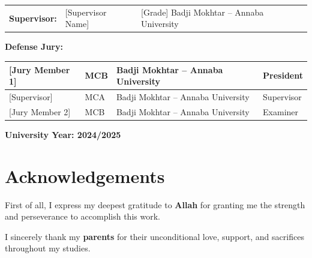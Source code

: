 \documentclass[12pt,a4paper]{report}
\begin{document}
\begin{titlepage}
  \begin{center}
    \begin{tabular}{lll}
      \textbf{Supervisor:} & [Supervisor Name] \quad & [Grade] \quad Badji Mokhtar -- Annaba University
    \end{tabular}
  \end{center}

  \vspace{0.45cm}

  \begin{center}
    \textbf{Defense Jury:}\\[8pt]
    \begin{tabular}{|p{3.8cm}|p{1.5cm}|p{4.2cm}|p{2.5cm}|}
      \hline
      {[Jury Member 1]} & MCB & Badji Mokhtar -- Annaba University & President   \\ \hline
      {[Supervisor]}    & MCA & Badji Mokhtar -- Annaba University & Supervisor  \\ \hline
      {[Jury Member 2]} & MCB & Badji Mokhtar -- Annaba University & Examiner    \\ \hline
    \end{tabular}
  \end{center}

  \vfill

  \begin{center}
    {\normalsize\bfseries University Year: 2024/2025}
  \end{center}

\end{titlepage}


\newpage
\chapter*{Acknowledgements}

\vspace{1cm}

First of all, I express my deepest gratitude to \textbf{Allah} for granting me
the strength and perseverance to accomplish this work.

\vspace{0.5cm}
I sincerely thank my \textbf{parents} for their unconditional love, support,
and sacrifices throughout my studies.
\end{document}
